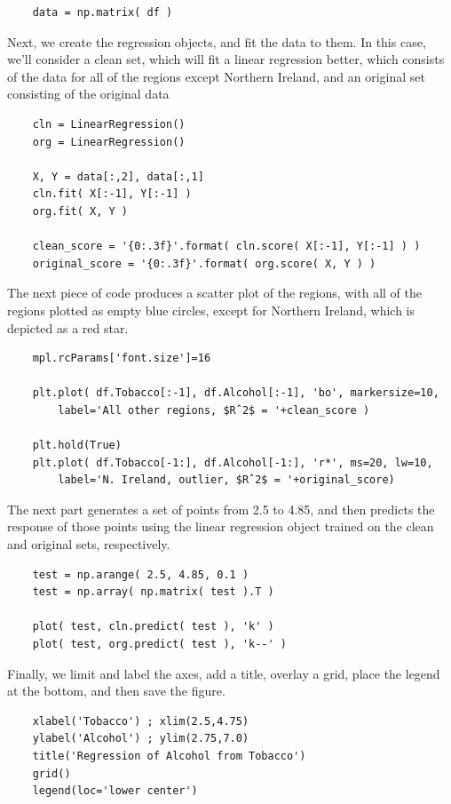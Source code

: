 \begin{lstlisting}	
    data = np.matrix( df )
\end{lstlisting}

Next, we create the regression objects, and fit the data to them. In this case, we’ll consider a clean set, which will fit a linear regression better, which consists of the data for all of the regions except Northern Ireland, and an original set consisting of the original data

\begin{lstlisting}	
    cln = LinearRegression()
    org = LinearRegression()

    X, Y = data[:,2], data[:,1]
    cln.fit( X[:-1], Y[:-1] )
    org.fit( X, Y )

    clean_score = '{0:.3f}'.format( cln.score( X[:-1], Y[:-1] ) )
    original_score = '{0:.3f}'.format( org.score( X, Y ) )
\end{lstlisting}

The next piece of code produces a scatter plot of the regions, with all of the regions plotted as empty blue circles, except for Northern Ireland, which is depicted as a red star.

\begin{lstlisting}
    mpl.rcParams['font.size']=16

    plt.plot( df.Tobacco[:-1], df.Alcohol[:-1], 'bo', markersize=10,
        label='All other regions, $Rˆ2$ = '+clean_score )

    plt.hold(True)
    plt.plot( df.Tobacco[-1:], df.Alcohol[-1:], 'r*', ms=20, lw=10,
        label='N. Ireland, outlier, $Rˆ2$ = '+original_score)
\end{lstlisting}

The next part generates a set of points from 2.5 to 4.85, and then predicts the response of those points using the linear regression object trained on the clean and original sets, respectively.

\begin{lstlisting}
    test = np.arange( 2.5, 4.85, 0.1 )
    test = np.array( np.matrix( test ).T )

    plot( test, cln.predict( test ), 'k' )
    plot( test, org.predict( test ), 'k--' )
\end{lstlisting}

Finally, we limit and label the axes, add a title, overlay a grid, place the legend at the bottom, and then save the figure.

\begin{lstlisting}
    xlabel('Tobacco') ; xlim(2.5,4.75)
    ylabel('Alcohol') ; ylim(2.75,7.0)
    title('Regression of Alcohol from Tobacco')
    grid()
    legend(loc='lower center')
\end{lstlisting}

